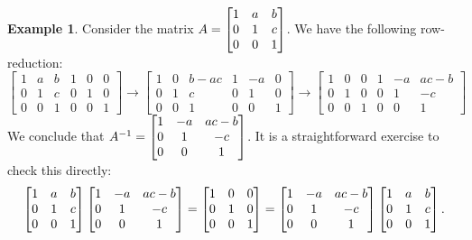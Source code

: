 \documentclass[reqno]{amsart}
\theoremstyle{definition}
\newtheorem{example}[theorem]{Example}
\begin{document}
\begin{example}\label{eg-inverse-i}
 Consider the matrix $A=\left[\begin{matrix} 1&a&b\\0&1&c\\0&0&1\end{matrix}\right]$.  We have the
 following row-reduction:
 \[
  \left[\begin{array}{ccc|ccc}
   1 & a & b & 1 & 0 & 0 \\
   0 & 1 & c & 0 & 1 & 0 \\
   0 & 0 & 1 & 0 & 0 & 1
  \end{array}\right]
  \to
  \left[\begin{array}{ccc|ccc}
   1 & 0 & b-ac & 1 & -a & 0 \\
   0 & 1 & c    & 0 &  1 & 0 \\
   0 & 0 & 1    & 0 &  0 & 1
  \end{array}\right]
  \to
  \left[\begin{array}{ccc|ccc}
   1 & 0 & 0 & 1 & -a & ac-b \\
   0 & 1 & 0 & 0 &  1 &-c \\
   0 & 0 & 1 & 0 &  0 & 1
  \end{array}\right]
 \]
 We conclude that $A^{-1}=\left[\begin{matrix} 1&-a&ac-b\\ 0&1&-c\\0&0&1\end{matrix}\right]$.
 It is a straightforward exercise to check this directly:
 \[
  \left[\begin{matrix} 1&a&b\\0&1&c\\0&0&1\end{matrix}\right]
  \left[\begin{matrix} 1&-a&ac-b\\ 0&1&-c\\0&0&1\end{matrix}\right]
  =
  \left[\begin{matrix} 1&0&0 \\ 0&1&0 \\ 0&0&1 \end{matrix}\right]
  =
  \left[\begin{matrix} 1&-a&ac-b\\ 0&1&-c\\0&0&1\end{matrix}\right]
  \left[\begin{matrix} 1&a&b\\0&1&c\\0&0&1\end{matrix}\right].
 \]
\end{example}
\end{document}

